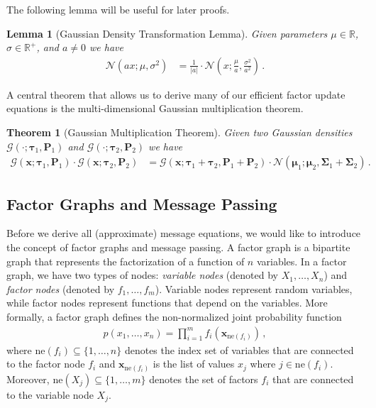 \documentclass[a4paper]{article}
\newcommand{\Real}{{\mathbb R}}
\newcommand{\Normal}[3]{{\mathcal N} \left({#1};{#2},{#3}\right)}
\newcommand{\Gauss}[3]{{\mathcal G} \left({#1};{#2},{#3}\right)}
\newcommand{\bs}[1]{{\boldsymbol{#1}}}
\newcommand{\neighbours}[1]{{\mathrm{ne} \left( {#1} \right)}}
\newtheorem{theorem}{Theorem}
\newtheorem{lemma}{Lemma}
\theoremstyle{definition}
\begin{document}
The following lemma will be useful for later proofs.
\begin{lemma}[Gaussian Density Transformation Lemma] \label{lem:gaussian_density_transformation}
    Given parameters $\mu \in \Real$, $\sigma \in \Real^+$, and $a \not= 0$ we have
    \begin{align*}
        \Normal{ax}{\mu}{\sigma^2} & = \frac{1}{|a|}\cdot\Normal{x}{\frac{\mu}{a}}{\frac{\sigma^2}{a^2}}\,.
    \end{align*}
\end{lemma}
A central theorem that allows us to derive many of our efficient factor update equations is the multi-dimensional Gaussian multiplication theorem.
\begin{theorem}[Gaussian Multiplication Theorem] \label{thm:gaussian_multiplication}
    Given two Gaussian densities $\Gauss{\cdot}{\bs{\tau}_1}{\bs{P}_1}$ and $\Gauss{\cdot}{\bs{\tau}_2}{\bs{P}_2}$ we have
    \begin{align*}
        \Gauss{\bs{x}}{\bs{\tau}_1}{\bs{P}_1} \cdot \Gauss{\bs{x}}{\bs{\tau}_2}{\bs{P}_2} & = \Gauss{\bs{x}}{\bs{\tau}_1 + \bs{\tau}_2}{\bs{P}_1 + \bs{P}_2} \cdot \Normal{\bs{\mu}_1}{\bs{\mu}_2}{\bs{\Sigma}_1 + \bs{\Sigma}_2}\,.
    \end{align*}
\end{theorem}

\subsection*{Factor Graphs and Message Passing}


Before we derive all (approximate) message equations, we would like to introduce the concept of factor graphs and message passing. A factor graph is a bipartite graph that represents the factorization of a function of $n$ variables. In a factor graph, we have two types of nodes: {\em variable nodes} (denoted by $X_1,\ldots,X_n$) and {\em factor nodes} (denoted by $f_1,\ldots,f_m$). Variable nodes represent random variables, while factor nodes represent functions that depend on the variables. More formally, a factor graph defines the non-normalized joint probability function
\begin{align}
    p(x_1,\ldots,x_n) = \prod_{i=1}^m f_i(\bs{x}_{\neighbours{f_i}}) \,, \label{eq:joint}
\end{align}
where $\neighbours{f_i} \subseteq \{1,\ldots,n\}$ denotes the index set of variables that are connected to the factor node $f_i$ and $\bs{x}_{\neighbours{f_i}}$ is the list of values $x_j$ where $j \in \neighbours{f_i}$. Moreover, $\neighbours{X_j} \subseteq \{1,\ldots,m\}$ denotes the set of factors $f_i$ that are connected to the variable node $X_j$.
\end{document}
